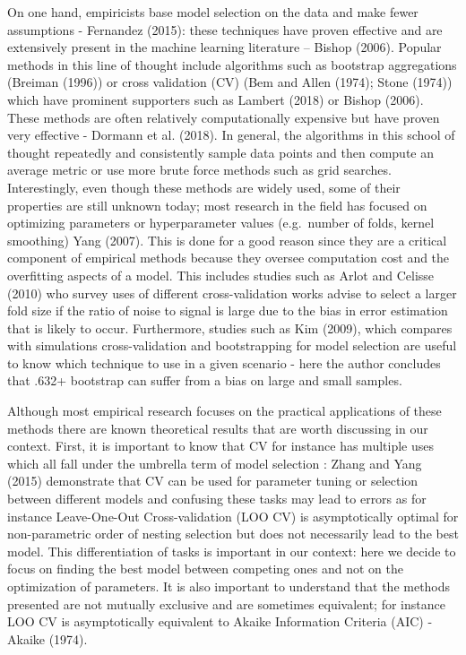 \documentclass[]{article}
\begin{document}
On one hand, empiricists base model selection on the data and make fewer
assumptions - Fernandez (2015): these techniques have proven effective
and are extensively present in the machine learning literature -- Bishop
(2006). Popular methods in this line of thought include algorithms such
as bootstrap aggregations (Breiman (1996)) or cross validation (CV) (Bem
and Allen (1974); Stone (1974)) which have prominent supporters such as
Lambert (2018) or Bishop (2006). These methods are often relatively
computationally expensive but have proven very effective - Dormann et
al. (2018). In general, the algorithms in this school of thought
repeatedly and consistently sample data points and then compute an
average metric or use more brute force methods such as grid searches.
Interestingly, even though these methods are widely used, some of their
properties are still unknown today; most research in the field has
focused on optimizing parameters or hyperparameter values (e.g.~number
of folds, kernel smoothing) Yang (2007). This is done for a good reason
since they are a critical component of empirical methods because they
oversee computation cost and the overfitting aspects of a model. This
includes studies such as Arlot and Celisse (2010) who survey uses of
different cross-validation works advise to select a larger fold size if
the ratio of noise to signal is large due to the bias in error
estimation that is likely to occur. Furthermore, studies such as Kim
(2009), which compares with simulations cross-validation and
bootstrapping for model selection are useful to know which technique to
use in a given scenario - here the author concludes that .632+ bootstrap
can suffer from a bias on large and small samples.

Although most empirical research focuses on the practical applications
of these methods there are known theoretical results that are worth
discussing in our context. First, it is important to know that CV for
instance has multiple uses which all fall under the umbrella term of
model selection : Zhang and Yang (2015) demonstrate that CV can be used
for parameter tuning or selection between different models and confusing
these tasks may lead to errors as for instance Leave-One-Out
Cross-validation (LOO CV) is asymptotically optimal for non-parametric
order of nesting selection but does not necessarily lead to the best
model. This differentiation of tasks is important in our context: here
we decide to focus on finding the best model between competing ones and
not on the optimization of parameters. It is also important to
understand that the methods presented are not mutually exclusive and are
sometimes equivalent; for instance LOO CV is asymptotically equivalent
to Akaike Information Criteria (AIC) - Akaike (1974).
\end{document}
